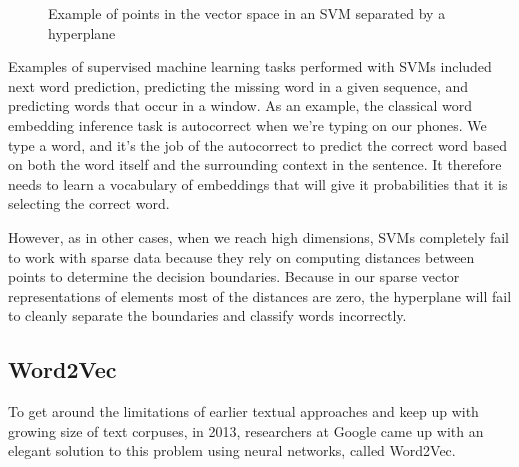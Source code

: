 \documentclass[11pt, table]{diazessay} %
\begin{document}
\begin{sloppypar}
\begin{figure}[H]
\caption{Example of points in the vector space in an SVM separated by a hyperplane}
\end{figure}


Examples of supervised machine learning tasks performed with SVMs included next word prediction, predicting the missing word in a given sequence, and predicting words that occur in a window. As an example, the classical word embedding inference task is autocorrect when we're typing on our phones. We type a word, and it's the job of the autocorrect to predict the correct word based on both the word itself and the surrounding context in the sentence. It therefore needs to learn a vocabulary of embeddings that will give it probabilities that it is selecting the correct word.

However, as in other cases, when we reach high dimensions, SVMs completely fail to work with sparse data because they rely on computing distances between points to determine the decision boundaries. Because in our sparse vector representations of elements most of the distances are zero, the hyperplane will fail to cleanly separate the boundaries and classify words incorrectly.

\subsection{Word2Vec}

To get around the limitations of earlier textual approaches and keep up with growing size of text corpuses, in 2013, researchers at Google came up with an elegant solution to this problem using neural networks, called Word2Vec\citep{mikolov2013efficient}.  


\end{sloppypar}
\end{document}
